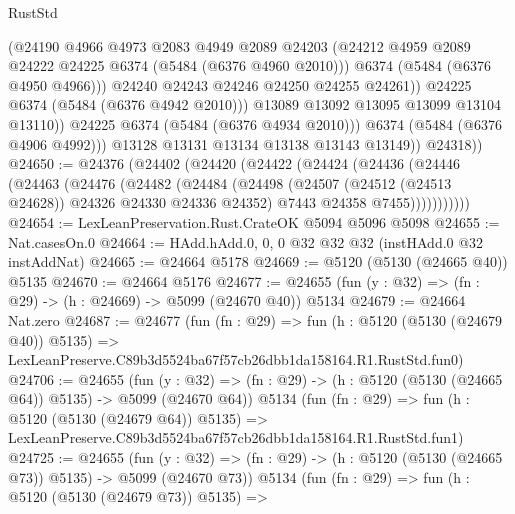\begin{lexlean}{RustStd}
\begin{coremodule}
                          (@24190
                            @4966
                            @4973
                            @2083
                            @4949
                            @2089
                            @24203
                            (@24212 @4959 @2089 @24222 @24225 @6374 (@5484 (@6376 @4960 @2010)))
                            @6374
                            (@5484 (@6376 @4950 @4966)))
                          @24240
                          @24243
                          @24246
                          @24250
                          @24255
                          @24261))
                      @24225
                      @6374
                      (@5484 (@6376 @4942 @2010)))
                    @13089
                    @13092
                    @13095
                    @13099
                    @13104
                    @13110))
                @24225
                @6374
                (@5484 (@6376 @4934 @2010)))
              @6374
              (@5484 (@6376 @4906 @4992)))
            @13128
            @13131
            @13134
            @13138
            @13143
            @13149))
        @24318))
@24650 := @24376
    (@24402
      (@24420
        (@24422
          (@24424
            (@24436
              (@24446
                (@24463
                  (@24476
                    (@24482
                      (@24484
                        (@24498
                          (@24507 (@24512 (@24513 @24628)) @24326 @24330 @24336 @24352)
                          @7443
                          @24358
                          @7455)))))))))))
@24654 := LexLeanPreservation.Rust.CrateOK @5094 @5096 @5098
@24655 := Nat.casesOn.{0}
@24664 := HAdd.hAdd.{0, 0, 0} @32 @32 @32 (instHAdd.{0} @32 instAddNat)
@24665 := @24664 @5178
@24669 := @5120 (@5130 (@24665 @40)) @5135
@24670 := @24664 @5176
@24677 := @24655 (fun (y : @32) => (fn : @29) -> (h : @24669) -> @5099 (@24670 @40)) @5134
@24679 := @24664 Nat.zero
@24687 := @24677
    (fun (fn : @29) =>
    fun (h : @5120 (@5130 (@24679 @40)) @5135) =>
    LexLeanPreserve.C89b3d5524ba67f57cb26dbb1da158164.R1.RustStd.fun0)
@24706 := @24655
    (fun (y : @32) => (fn : @29) -> (h : @5120 (@5130 (@24665 @64)) @5135) -> @5099 (@24670 @64))
    @5134
    (fun (fn : @29) =>
    fun (h : @5120 (@5130 (@24679 @64)) @5135) =>
    LexLeanPreserve.C89b3d5524ba67f57cb26dbb1da158164.R1.RustStd.fun1)
@24725 := @24655
    (fun (y : @32) => (fn : @29) -> (h : @5120 (@5130 (@24665 @73)) @5135) -> @5099 (@24670 @73))
    @5134
    (fun (fn : @29) =>
    fun (h : @5120 (@5130 (@24679 @73)) @5135) =>

\end{coremodule}
\end{lexlean}

